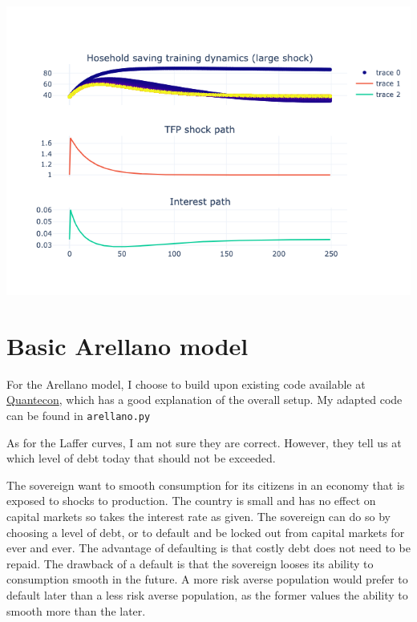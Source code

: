 \includegraphics[scale = 0.8]{figures/training_dynamics_large_shock.png}

\section{Basic Arellano model}

For the Arellano model, I choose to build upon existing code available at \href{https://python-advanced.quantecon.org/arellano.html}{Quantecon}, which has a good explanation of the overall setup. My adapted code can be found in \texttt{arellano.py}

As for the Laffer curves, I am not sure they are correct. However, they tell us at which level of debt today that should not be exceeded.

The sovereign want to smooth consumption for its citizens in an economy that is exposed to shocks to production. The country is small and has no effect on capital markets so takes the interest rate as given. The sovereign can do so by choosing a level of debt, or to default and be locked out from capital markets for ever and ever. The advantage of defaulting is that costly debt does not need to be repaid. The drawback of a default is that the sovereign looses its ability to consumption smooth in the future. A more risk averse population would prefer to default later than a less risk averse population, as the former values the ability to smooth more than the later.

